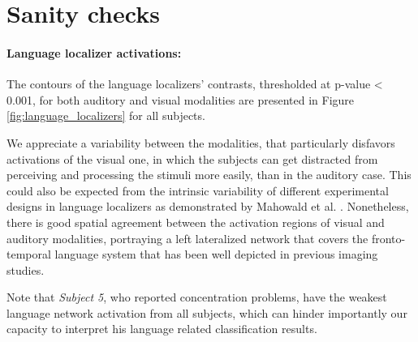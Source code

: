 \section{Sanity checks}\label{sec:sanity_checks}

\paragraph{Language localizer activations:}
The contours of the language localizers' contrasts, thresholded at p-value < 0.001, for both auditory and visual modalities are presented in Figure \ref{fig:language_localizers} for all subjects.


We appreciate a variability between the modalities, that particularly disfavors activations of the visual one, in which the subjects can get distracted from perceiving and processing the stimuli more easily, than in the auditory case.
This could also be expected from the intrinsic variability of different experimental designs in language localizers as demonstrated by Mahowald et al. \citep{mahowald2016reliable}.
Nonetheless, there is good spatial agreement between the activation regions of visual and auditory modalities, portraying a left lateralized network that covers the fronto-temporal language system that has been well depicted in previous imaging studies\citep{mahowald2016reliable, fedorenko2010new, dehaene2010learning, binder1997human}.


Note that \emph{Subject 5}, who reported concentration problems, have the weakest language network activation from all subjects, which can hinder importantly our capacity to interpret his language related classification results.


